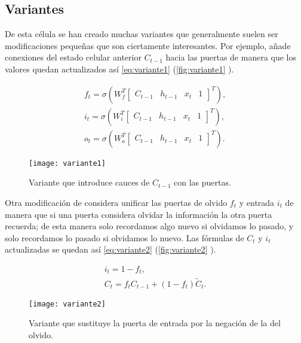 \subsection{Variantes}

De esta célula se han creado muchas variantes que generalmente suelen ser modificaciones pequeñas que son ciertamente interesantes. Por ejemplo, \cite{gers2000recurrent} añade conexiones del estado celular anterior $C_{t-1}$ hacia las puertas de manera que los valores quedan actualizados así \eqref{eq:variante1} (\autoref{fig:variante1} \cite{christopher2015lstm}).

\begin{gather}
  f_t = \sigma\left(W_f^T \begin{bmatrix} C_{t-1} & h_{t-1} & x_t & 1 \end{bmatrix}^T \right), \\
  i_t = \sigma\left(W_i^T \begin{bmatrix} C_{t-1} & h_{t-1} & x_t & 1 \end{bmatrix}^T\right), \\
  o_t = \sigma\left(W_o^T \begin{bmatrix} C_{t-1} & h_{t-1} & x_t & 1 \end{bmatrix}^T\right).
  \label{eq:variante1}
\end{gather}

\begin{figure}[htpb]
  \centering
  \texttt{[image: variante1]}
  \caption{Variante que introduce cauces de $C_{t-1}$ con las puertas.}
  \label{fig:variante1}
\end{figure}

Otra modificación de \cite{gers2000recurrent} considera unificar las puertas de olvido $f_t$ y entrada $i_t$ de manera que si una puerta considera olvidar la información la otra puerta recuerda; de esta manera solo recordamos algo nuevo si olvidamos lo pasado, y solo recordamos lo pasado si olvidamos lo nuevo. Las fórmulas de $C_t$ y $i_t$ actualizadas se quedan así \eqref{eq:variante2} (\autoref{fig:variante2} \cite{christopher2015lstm}).

\begin{gather}
  i_t = 1 - f_t, \\
  C_t = f_t C_{t-1} + (1 - f_t) \widetilde{C}_t.
  \label{eq:variante2}
\end{gather}

\begin{figure}[htpb]
  \centering
  \texttt{[image: variante2]}
  \caption{Variante que sustituye la puerta de entrada por la negación de la del olvido.}
  \label{fig:variante2}
\end{figure}

